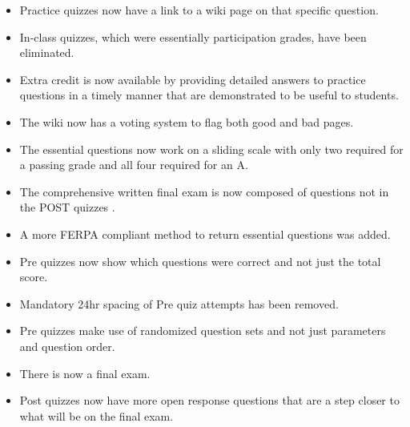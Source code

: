 \documentclass[letterpaper,10pt]{article}
\begin{document}
\begin{itemize}
    \item Practice quizzes now have a link to a wiki page on that specific question.
     \item In-class quizzes, which were essentially participation grades, have been eliminated.
     \item Extra credit is now available by providing detailed answers to practice questions in a timely manner that are demonstrated to be useful to students.
    \item The wiki now has a voting system to flag both good and bad pages.
     \item The essential questions now work on a sliding scale with only two required for a passing grade and all four required for an A.
    \item The comprehensive written final exam is now composed of questions not in the POST quizzes .
     \item A more FERPA compliant method to return essential questions was added.
    \item Pre quizzes now show which questions were correct and not just the total score.
     \item Mandatory 24hr spacing of Pre quiz attempts has been removed.
    \item Pre quizzes make use of randomized question sets and not just parameters and question order.
    \item There is now a final exam.
    \item Post quizzes now have more open response questions that are a step closer to what will be on the final exam.
\end{itemize}
\end{document}
